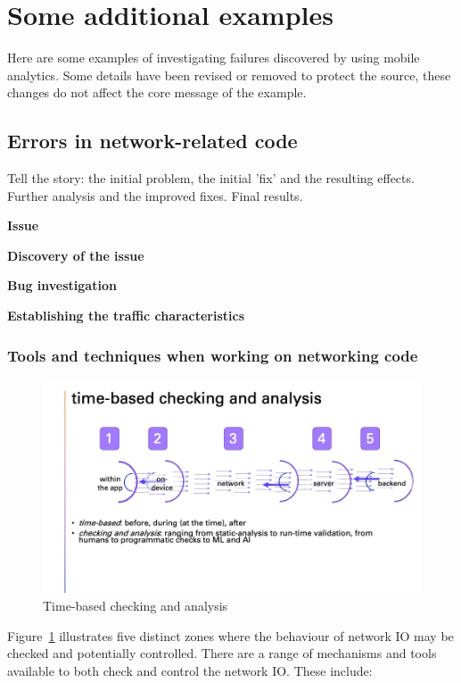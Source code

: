 \section{Some additional examples}
\label{section-some-examples}
Here are some examples of investigating failures discovered by using mobile analytics. Some details have been revised or removed to protect the source, these changes do not affect the core message of the example.

\subsection{Errors in network-related code}

Tell the story: the initial problem, the initial 'fix' and the resulting effects. Further analysis and the improved fixes. Final results.

\textbf{Issue}

\textbf{Discovery of the issue}

\textbf{Bug investigation}

\textbf{Establishing the traffic characteristics}

\subsubsection{Tools and techniques when working on networking code}

\begin{figure}
    \centering
    \includegraphics[width=15cm]{images/my/time-based-checking-and-analysis.jpg}
    \caption{Time-based checking and analysis}
    \label{fig:my_timebased-checking-and-analysis}
\end{figure}

Figure~\ref{fig:my_timebased-checking-and-analysis} illustrates five distinct zones where the behaviour of network IO may be checked and potentially controlled. There are a range of mechanisms and tools available to both check and control the network IO. These include:

